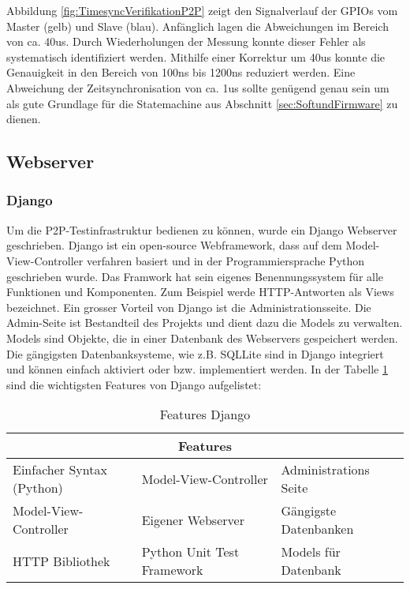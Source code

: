 Abbildung \ref{fig:TimesyncVerifikationP2P} zeigt den Signalverlauf der GPIOs vom Master (gelb) und Slave (blau). Anfänglich lagen die Abweichungen im Bereich von ca. 40us. Durch Wiederholungen der Messung konnte dieser Fehler als systematisch identifiziert werden. Mithilfe einer Korrektur um 40us konnte die Genauigkeit in den Bereich von 100ns bis 1200ns reduziert werden. Eine Abweichung der Zeitsynchronisation von ca. 1us sollte genügend genau sein um als gute Grundlage für die Statemachine aus Abschnitt \ref{sec:SoftundFirmware} zu dienen. 
 
 \newpage
\subsection{Webserver}\label{subsec:DjangoWebserver}
\subsubsection{Django}\label{subsubsec:Django}
Um die P2P-Testinfrastruktur bedienen zu können, wurde ein Django Webserver geschrieben. Django ist ein open-source Webframework, dass auf dem Model-View-Controller verfahren basiert und in der Programmiersprache Python geschrieben wurde. Das Framwork hat sein eigenes Benennungssystem für alle Funktionen und Komponenten. Zum Beispiel werde HTTP-Antworten als Views bezeichnet. Ein grosser Vorteil von Django ist die Administrationsseite. Die Admin-Seite ist Bestandteil des Projekts und dient dazu die Models zu verwalten. Models sind Objekte, die in einer Datenbank des Webservers gespeichert werden. Die gängigsten Datenbanksysteme, wie z.B. SQLLite sind in Django integriert und können einfach aktiviert oder bzw. implementiert werden. In der Tabelle \ref{table:FeaturesDjango} sind die wichtigsten Features von Django aufgelistet:

\begin{table}[H]
	\centering
	\begin{adjustbox}{width=1\textwidth}
		\begin{tabular}{@{}|l|l|l|@{}}
			\toprule
			\multicolumn{3}{|c|}{\textbf{Features}}                                        \\ \midrule
			Einfacher Syntax (Python) & Model-View-Controller      & Administrations Seite \\ \midrule
			Model-View-Controller     & Eigener Webserver          & Gängigste Datenbanken \\ \midrule
			HTTP Bibliothek           & Python Unit Test Framework & Models für Datenbank  \\ \bottomrule
		\end{tabular}
	\end{adjustbox}
	\caption{Features Django}
	\label{table:FeaturesDjango}
\end{table}

